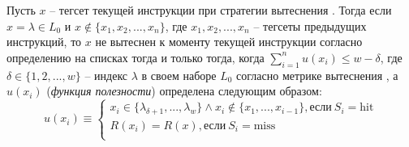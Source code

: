 \begin{lemma}\label{hit_I'} Пусть $x$ -- тегсет текущей
инструкции при стратегии вытеснения \LRU. Тогда если $x = \lambda
\in L_0$ и $x \notin \{x_1, x_2, ..., x_n\}$, где $x_1, x_2, ...,
x_n$ -- тегсеты предыдущих инструкций, то $x$ не вытеснен к моменту
текущей инструкции согласно определению \LRU на списках тогда и
только тогда, когда $\sum^n_{i=1} u(x_i) \leqslant w - \delta$, где
$\delta \in \{1, 2, ..., w\}$ -- индекс $\lambda$ в своем наборе
$L_0$ согласно метрике вытеснения \LRU, а $u(x_i)$ (\emph{функция
полезности}) определена следующим образом:
$$u(x_i) \equiv \left\{
\begin{array}{l}
    x_i \in \{ \lambda_{\delta+1}, ..., \lambda_w\} \wedge x_i \notin
\{x_1, ..., x_{i-1}\}, \mbox{если}~S_i=\mbox{hit} \\
    R(x_i) = R(x), \mbox{если}~S_i=\mbox{miss}\\
\end{array}
\right.$$

\end{lemma}

